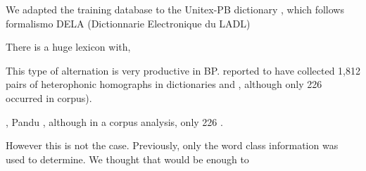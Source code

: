 We adapted the training database to the Unitex-PB dictionary \cite{Muniz2004}, which follows  formalismo DELA (Dictionnarie Electronique du LADL)

There is a huge lexicon with,

This type of alternation is very productive in \ac{BP}.  reported to have collected 1,812 pairs of heterophonic homographs in dictionaries and , although only 226 occurred in corpus).

\citeauthor{}, Pandu , although in a corpus analysis, only 226 \cite{Shulby2013}.

However this is not the case. Previously, only the word class information was used to determine. We thought that would be enough to 


